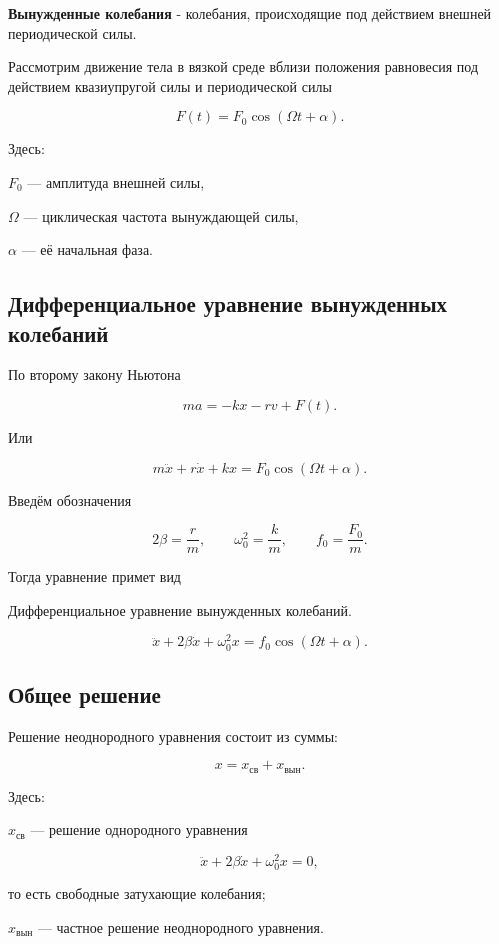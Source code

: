 \documentclass[a4paper,12pt]{article}
\begin{document}
\begin{definitionbox}
\textbf{Вынужденные колебания} - колебания, происходящие под действием внешней периодической силы.
\end{definitionbox}

Рассмотрим движение тела в вязкой среде вблизи положения равновесия под действием квазиупругой силы и периодической силы

\[
F(t)=F_0\cos(\Omega t+\alpha).
\]

Здесь:

$F_0$ — амплитуда внешней силы,

$\Omega$ — циклическая частота вынуждающей силы,

$\alpha$ — её начальная фаза.

\subsection*{Дифференциальное уравнение вынужденных колебаний}

По второму закону Ньютона

\[
ma=-kx-rv+F(t).
\]

Или

\[
m\ddot{x}+r\dot{x}+kx=F_0\cos(\Omega t+\alpha).
\]

Введём обозначения

\[
2\beta=\frac{r}{m},
\qquad
\omega_0^2=\frac{k}{m},
\qquad
f_0=\frac{F_0}{m}.
\]

Тогда уравнение примет вид

\begin{theorembox}
Дифференциальное уравнение вынужденных колебаний.

\[
\ddot{x}+2\beta\dot{x}+\omega_0^2x=f_0\cos(\Omega t+\alpha).
\]
\end{theorembox}


\subsection*{Общее решение}

Решение неоднородного уравнения состоит из суммы:

\[
x=x_{\text{св}}+x_{\text{вын}}.
\]

Здесь:

$x_{\text{св}}$ — решение однородного уравнения

\[
\ddot{x}+2\beta\dot{x}+\omega_0^2x=0,
\]

то есть свободные затухающие колебания;

$x_{\text{вын}}$ — частное решение неоднородного уравнения.
\end{document}
